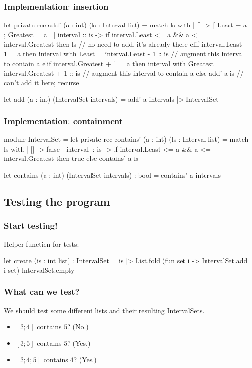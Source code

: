 \documentclass{beamer}
\begin{document}
\begin{frame}[fragile]
\frametitle{Implementation: insertion}
\begin{fslisting}
let private rec add' (a : int) (ls : Interval list) =
    match ls with
    | [] -> [{ Least = a ; Greatest = a }]
    | interval :: is ->
        if interval.Least <= a && a <= interval.Greatest then
            ls // no need to add, it's already there
        elif interval.Least - 1 = a then
            { interval with Least = interval.Least - 1 }
            :: is // augment this interval to contain a
        elif interval.Greatest + 1 = a then
            { interval with Greatest = interval.Greatest + 1 }
            :: is // augment this interval to contain a
        else
            add' a is // can't add it here; recurse

let add (a : int) (IntervalSet intervals) =
    add' a intervals
    |> IntervalSet
\end{fslisting}
\end{frame}

\begin{frame}[fragile]
\frametitle{Implementation: containment}

\begin{fslisting}
[<RequireQualifiedAccess>]
module IntervalSet =
    let private rec contains' (a : int) (ls : Interval list) =
        match ls with
        | [] -> false
        | interval :: is ->
            if interval.Least <= a && a <= interval.Greatest then
                true
            else
                contains' a is

    let contains (a : int) (IntervalSet intervals) : bool =
        contains' a intervals

\end{fslisting}
\end{frame}

\subsection{Testing the program}

\begin{frame}[fragile]
\frametitle{Start testing!}
Helper function for tests:
\begin{fslisting}
let create (is : int list) : IntervalSet =
    is
    |> List.fold
        (fun set i -> IntervalSet.add i set)
        IntervalSet.empty
\end{fslisting}
\end{frame}
\begin{frame}
\frametitle{What can we test?}
We should test some different lists and their resulting IntervalSets.

\begin{itemize}
    \item $[3; 4]$ contains $5$? (No.)
    \item $[3; 5]$ contains $5$? (Yes.)
    \item $[3; 4; 5]$ contains $4$? (Yes.)
\end{itemize}
\end{frame}
\end{document}
